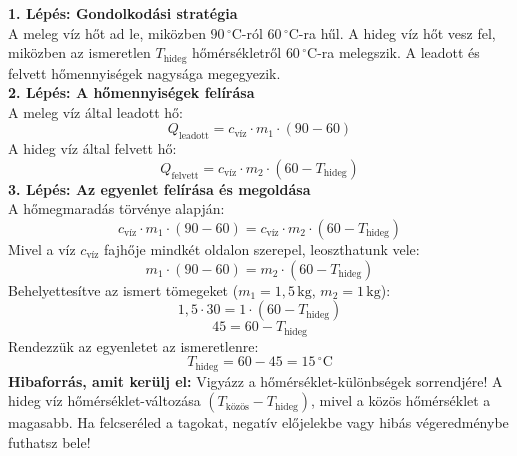 \documentclass[11pt,a4paper]{article}
\begin{document}
\begin{tcolorbox}[title=Megoldási lépések]
\textbf{1. Lépés: Gondolkodási stratégia}\\
A meleg víz hőt ad le, miközben $90\,^\circ\text{C}$-ról $60\,^\circ\text{C}$-ra hűl. A hideg víz hőt vesz fel, miközben az ismeretlen $T_{\text{hideg}}$ hőmérsékletről $60\,^\circ\text{C}$-ra melegszik. A leadott és felvett hőmennyiségek nagysága megegyezik.\\[6pt]
\textbf{2. Lépés: A hőmennyiségek felírása}\\
A meleg víz által leadott hő: 
$$Q_{\text{leadott}} = c_{\text{víz}} \cdot m_1 \cdot (90 - 60)$$
A hideg víz által felvett hő: 
$$Q_{\text{felvett}} = c_{\text{víz}} \cdot m_2 \cdot (60 - T_{\text{hideg}})$$
\textbf{3. Lépés: Az egyenlet felírása és megoldása}\\
A hőmegmaradás törvénye alapján:
$$c_{\text{víz}} \cdot m_1 \cdot (90 - 60) = c_{\text{víz}} \cdot m_2 \cdot (60 - T_{\text{hideg}})$$
Mivel a víz $c_{\text{víz}}$ fajhője mindkét oldalon szerepel, leoszthatunk vele:
$$m_1 \cdot (90 - 60) = m_2 \cdot (60 - T_{\text{hideg}})$$
Behelyettesítve az ismert tömegeket ($m_1 = 1{,}5\,\text{kg}$, $m_2 = 1\,\text{kg}$):
$$1{,}5 \cdot 30 = 1 \cdot (60 - T_{\text{hideg}})$$
$$45 = 60 - T_{\text{hideg}}$$
Rendezzük az egyenletet az ismeretlenre:
$$T_{\text{hideg}} = 60 - 45 = 15\,^\circ\text{C}$$
\textbf{Hibaforrás, amit kerülj el:} Vigyázz a hőmérséklet-különbségek sorrendjére! A hideg víz hőmérséklet-változása $(T_{\text{közös}} - T_{\text{hideg}})$, mivel a közös hőmérséklet a magasabb. Ha felcseréled a tagokat, negatív előjelekbe vagy hibás végeredménybe futhatsz bele!
\end{tcolorbox}
\end{document}
